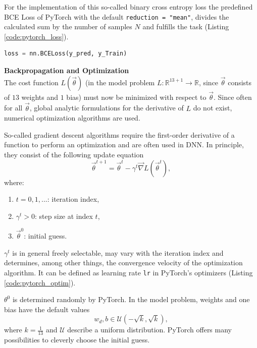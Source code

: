 For the implementation of this so-called binary cross entropy loss the predefined BCE Loss of PyTorch with the default \texttt{reduction =  "mean"}, divides the calculated sum by the number of samples $N$ and fulfills the task (Listing \ref{code:pytorch_loss}). 
\begin{lstlisting}[float, language=python, caption={Usage of PyTorchs defined BCE loss function.}, label=code:pytorch_loss]
loss = nn.BCELoss(y_pred, y_Train)
\end{lstlisting}

\textbf{Backpropagation and Optimization}\\
The cost function $L(\vec{\theta})$ (in the model problem $L: \mathbb{R}^{13+1} \rightarrow \mathbb{R}$, since $\vec{\theta}$ consists of $13$ weights and $1$ bias) must now be minimized with respect to $\vec{\theta}$. Since often for all $\vec{\theta}$, global analytic formulations for the derivative of $L$ do not exist, numerical optimization algorithms are used.

So-called gradient descent algorithms require the first-order derivative of a function to perform an optimization and are often used in DNN. In principle, they consist of the following update equation
\begin{equation}
    \vec{\theta}^{t+1} = \vec{\theta}^t - \gamma^t\vec{\nabla}L(\vec{\theta}^t),
    \label{eq:grad_des}
\end{equation}
where:
\begin{enumerate}
    \item $t = 0, 1, ...$: iteration index,
    \item $\gamma^t > 0$: step size at index $t$,
    \item $\vec{\theta}^0$: initial guess.
\end{enumerate}

$\gamma^t$ is in general freely selectable, may vary with the iteration index and determines, among other things, the convergence velocity of the optimization algorithm. It can be defined as learning rate \texttt{lr} in PyTorch's optimizers (Listing \ref{code:pytorch_optim}).

$\theta^0$ is determined randomly by PyTorch. In the model problem, weights and one bias have the default values
\begin{equation}
    w_d, b \in \mathcal{U}(-\sqrt{k},\sqrt{k}),
\end{equation}
where $k=\frac{1}{13}$ and $\mathcal{U}$ describe a uniform distribution. PyTorch offers many possibilities to cleverly choose the initial guess.

